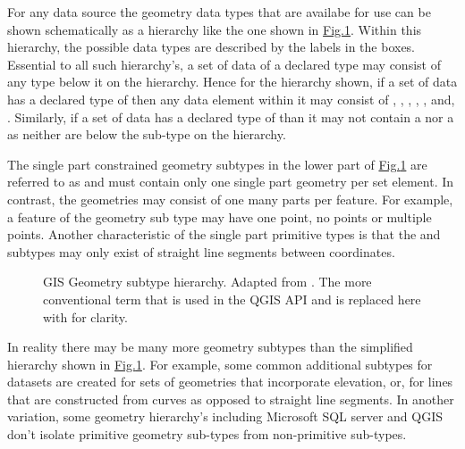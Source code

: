 \documentclass[a4paper,11pt,english]{sphinxmanual}
\begin{document}
For any data source the geometry data types that are availabe for use can be shown schematically as a hierarchy like the one shown in \hyperref[\detokenize{background:figuregeomtypei}]{Fig.\@ \ref{\detokenize{background:figuregeomtypei}}}.  Within this hierarchy, the possible data types are described by the labels in the boxes.  Essential to all such hierarchy’s, a set of data of a declared type may consist of any type below it on the hierarchy.  Hence for the hierarchy shown, if a set of data has a declared type of  then any data element within it may consist of , , , , , and, .  Similarly, if a set of data has a declared type of  than it may not contain a  nor a  as neither are below the sub-type  on the hierarchy.

The single part constrained geometry subtypes in the lower part of \hyperref[\detokenize{background:figuregeomtypei}]{Fig.\@ \ref{\detokenize{background:figuregeomtypei}}} are referred to as  and must contain only one single part geometry per set element.  In contrast, the  geometries may consist of one  many parts per feature.  For example, a feature of the  geometry sub type may have one point, no points or multiple points. Another characteristic of the single part primitive types is that the  and  subtypes may only exist of straight line segments between coordinates.

\begin{figure}[htbp]
\centering
\capstart

\noindent{}
\caption{GIS Geometry subtype hierarchy.  Adapted from .  The more conventional term  that is used in the QGIS API and  is replaced here with  for clarity.}\label{\detokenize{background:id29}}\label{\detokenize{background:figuregeomtypei}}\end{figure}

In reality there may be many more geometry subtypes than the simplified hierarchy shown in \hyperref[\detokenize{background:figuregeomtypei}]{Fig.\@ \ref{\detokenize{background:figuregeomtypei}}}.  For example, some common additional subtypes for datasets are created for sets of geometries that incorporate elevation, or, for lines that are constructed from curves as opposed to straight line segments.  In another variation, some geometry hierarchy’s including Microsoft SQL server and QGIS don’t isolate primitive geometry sub-types from non-primitive sub-types.
\end{document}
